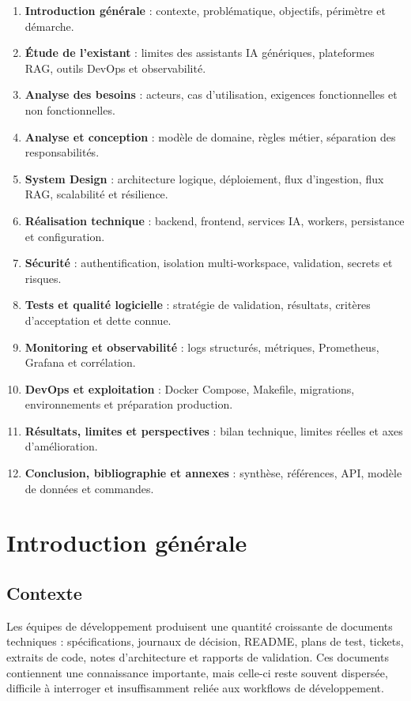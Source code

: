 \documentclass[12pt,a4paper,oneside]{report}
\begin{document}
\begin{enumerate}
  \item \textbf{Introduction générale} : contexte, problématique, objectifs, périmètre et démarche.
  \item \textbf{Étude de l'existant} : limites des assistants IA génériques, plateformes RAG, outils DevOps et observabilité.
  \item \textbf{Analyse des besoins} : acteurs, cas d'utilisation, exigences fonctionnelles et non fonctionnelles.
  \item \textbf{Analyse et conception} : modèle de domaine, règles métier, séparation des responsabilités.
  \item \textbf{System Design} : architecture logique, déploiement, flux d'ingestion, flux RAG, scalabilité et résilience.
  \item \textbf{Réalisation technique} : backend, frontend, services IA, workers, persistance et configuration.
  \item \textbf{Sécurité} : authentification, isolation multi-workspace, validation, secrets et risques.
  \item \textbf{Tests et qualité logicielle} : stratégie de validation, résultats, critères d'acceptation et dette connue.
  \item \textbf{Monitoring et observabilité} : logs structurés, métriques, Prometheus, Grafana et corrélation.
  \item \textbf{DevOps et exploitation} : Docker Compose, Makefile, migrations, environnements et préparation production.
  \item \textbf{Résultats, limites et perspectives} : bilan technique, limites réelles et axes d'amélioration.
  \item \textbf{Conclusion, bibliographie et annexes} : synthèse, références, API, modèle de données et commandes.
\end{enumerate}

\chapter{Introduction générale}

\section{Contexte}
Les équipes de développement produisent une quantité croissante de documents techniques : spécifications, journaux de décision, README, plans de test, tickets, extraits de code, notes d'architecture et rapports de validation. Ces documents contiennent une connaissance importante, mais celle-ci reste souvent dispersée, difficile à interroger et insuffisamment reliée aux workflows de développement.
\end{document}
